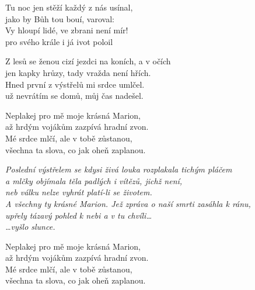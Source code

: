 
\ve{}
Tu noc jen stěží každý z nás usínal,\\
jako by Bůh tou bouí, varoval:\\
Vy hloupí lidé, ve zbrani není mír!\\
pro svého krále i já ivot poloil

\ve{}
Z lesů se ženou cizí jezdci na koních, a v očích\\
jen kapky hrůzy, tady vražda není hřích.\\
Hned první z výstřelů mi srdce umlčel.\\
už nevrátím se domů, můj čas nadešel.

\ve{}
Neplakej pro mě moje krásná Marion,\\
až hrdým vojákům zazpívá hradní zvon.\\
Mé srdce mlčí, ale v tobě zůstanou,\\
všechna ta slova, co jak oheň zaplanou.

\textit{Poslední výstřelem se kdysi živá louka rozplakala tichým pláčem\\
a mlčky objímala těla padlých i vítězů, jichž není,\\
neb válku nelze vyhrát platí-li se životem.\\
A všechny ty krásné Marion. Jež zpráva o naší smrti zasáhla k ránu,\\
upřely tázavý pohled k nebi a v tu chvíli\ldots{}\\
\ldots{}vyšlo slunce.}

\ve{}
Neplakej pro mě moje krásná Marion,\\
až hrdým vojákům zazpívá hradní zvon.\\
Mé srdce mlčí, ale v tobě zůstanou,\\
všechna ta slova, co jak oheň zaplanou. 

\esong